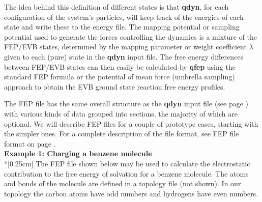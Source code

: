 \documentclass[a4paper,10pt]{article}
\begin{document}
The  idea  behind   this  definition  of  different   states  is  that
\textbf{qdyn}, for each configuration  of the system's particles, will
keep track of the energies of each state and write these to the energy
file.  The  mapping potential or  sampling potential used  to generate
the  forces controlling  the  dynamics  is a  mixture  of the  FEP/EVB
states,  determined by  the  mapping parameter  or weight  coefficient
$\lambda  $ given  to each  (pure)  state in  the \textbf{qdyn}  input
file.  The free  energy differences  between FEP/EVB  states can  then
easily be calculated  by \textbf{qfep} using the  standard FEP formula
or the potential of mean  force (umbrella sampling) approach to obtain
the EVB ground state reaction free energy profiles.

The FEP file has the same overall structure as the \textbf{qdyn} input
file (see page \pageref{subsubsec:prep_qdyn_inp_f}) with various kinds
of data grouped into sections, the majority of which are optional.  We
will describe FEP files for a couple of prototype cases, starting with
the simpler ones.  For a complete description of the  file format, see
FEP file format on page \pageref{subsubsec:fepfileformat}.\\


\textbf{Example 1: Charging a benzene molecule}\\*[0.25cm] 
The FEP  file shown below may  be used to calculate  the electrostatic
contribution  to   the  free  energy   of  solvation  for   a  benzene
molecule.  The atoms  and  bonds  of the  molecule  are  defined in  a
topology file (not  shown). In our topology the carbon  atoms have odd
numbers and hydrogens have even numbers.
\end{document}
